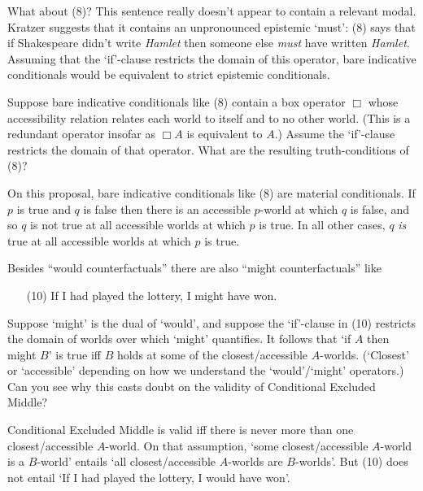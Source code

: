 What about (8)? This sentence really doesn't appear to contain a relevant modal.
Kratzer suggests that it contains an unpronounced epistemic `must': (8) says
that if Shakespeare didn't write \emph{Hamlet} then someone else \emph{must}
have written \emph{Hamlet}. Assuming that the `if'-clause restricts the domain
of this operator, bare indicative conditionals would be equivalent to
strict epistemic conditionals.

\begin{exercise}
  Suppose bare indicative conditionals like (8) contain a box operator $\Box$
  whose accessibility relation relates each world to itself and to no other
  world. (This is a redundant operator insofar as $\Box A$ is equivalent to $A$.)
  Assume the `if'-clause restricts the domain of that operator. What are the
  resulting truth-conditions of (8)?
\end{exercise}
\begin{solution}
  On this proposal, bare indicative conditionals like (8) are material
  conditionals. If $p$ is true and $q$ is false then there is an accessible
  $p$-world at which $q$ is false, and so $q$ is not true at all accessible
  worlds at which $p$ is true. In all other cases, $q$ \emph{is} true at all
  accessible worlds at which $p$ is true.
\end{solution}

\begin{exercise}
  Besides ``would counterfactuals'' there are also ``might counterfactuals'' like
  \begin{enumerate}[leftmargin=10mm]
    \item[(10)] If I had played the lottery, I might have won.
  \end{enumerate}
  Suppose `might' is the dual of `would', and suppose the `if'-clause in (10)
  restricts the domain of worlds over which `might' quantifies. It follows that
  `if $A$ then might $B$' is true iff $B$ holds at some of the
  closest/accessible $A$-worlds. (`Closest' or `accessible' depending on how we
  understand the `would'/`might' operators.) Can you see why this casts doubt on
  the validity of Conditional Excluded Middle?
\end{exercise}
\begin{solution}
  Conditional Excluded Middle is valid iff there is never more than one
  closest/accessible $A$-world. On that assumption, `some closest/accessible
  $A$-world is a $B$-world' entails `all closest/accessible $A$-worlds are
  $B$-worlds'. But (10) does not entail `If I had played the lottery, I would
  have won'.
\end{solution}


